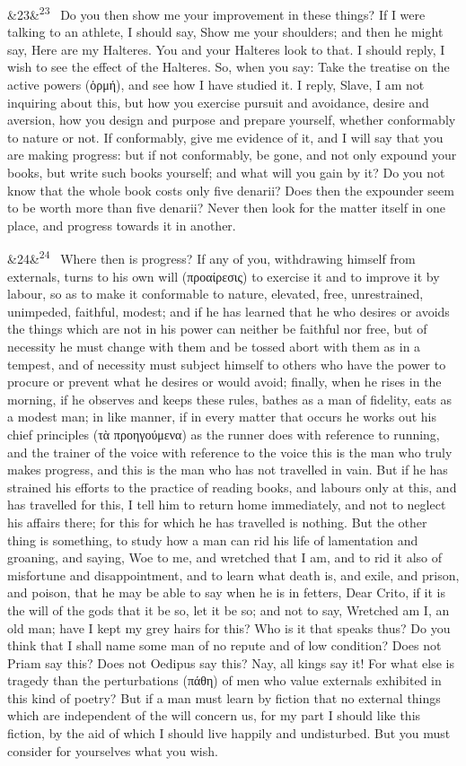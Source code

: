 \documentclass[12pt]{article}
\newcommand{\para}[1][]{\par\noindent\ifx&#1&\else\textsuperscript{\footnotesize #1}~\fi}
\begin{document}
\para[23] Do you then show me your improvement in these things? If I were talking to an athlete, I should say, Show me your shoulders; and then he might say, Here are my Halteres. You and your Halteres look to that. I should reply, I wish to see the effect of the Halteres. So, when you say: Take the treatise on the active powers (ὁρμή), and see how I have studied it. I reply, Slave, I am not inquiring about this, but how you exercise pursuit and avoidance, desire and aversion, how you design and purpose and prepare yourself, whether conformably to nature or not. If conformably, give me evidence of it, and I will say that you are making progress: but if not conformably, be gone, and not only expound your books, but write such books yourself; and what will you gain by it? Do you not know that the whole book costs only five denarii? Does then the expounder seem to be worth more than five denarii? Never then look for the matter itself in one place, and progress towards it in another.

\para[24] Where then is progress? If any of you, withdrawing himself from externals, turns to his own will (προαίρεσις) to exercise it and to improve it by labour, so as to make it conformable to nature, elevated, free, unrestrained, unimpeded, faithful, modest; and if he has learned that he who desires or avoids the things which are not in his power can neither be faithful nor free, but of necessity he must change with them and be tossed abort with them as in a tempest, and of necessity must subject himself to others who have the power to procure or prevent what he desires or would avoid; finally, when he rises in the morning, if he observes and keeps these rules, bathes as a man of fidelity, eats as a modest man; in like manner, if in every matter that occurs he works out his chief principles (τὰ προηγούμενα) as the runner does with reference to running, and the trainer of the voice with reference to the voice this is the man who truly makes progress, and this is the man who has not travelled in vain. But if he has strained his efforts to the practice of reading books, and labours only at this, and has travelled for this, I tell him to return home immediately, and not to neglect his affairs there; for this for which he has travelled is nothing. But the other thing is something, to study how a man can rid his life of lamentation and groaning, and saying, Woe to me, and wretched that I am, and to rid it also of misfortune and disappointment, and to learn what death is, and exile, and prison, and poison, that he may be able to say when he is in fetters, Dear Crito, if it is the will of the gods that it be so, let it be so; and not to say, Wretched am I, an old man; have I kept my grey hairs for this? Who is it that speaks thus? Do you think that I shall name some man of no repute and of low condition? Does not Priam say this? Does not Oedipus say this? Nay, all kings say it! For what else is tragedy than the perturbations (πάθη) of men who value externals exhibited in this kind of poetry? But if a man must learn by fiction that no external things which are independent of the will concern us, for my part I should like this fiction, by the aid of which I should live happily and undisturbed. But you must consider for yourselves what you wish.
\end{document}
